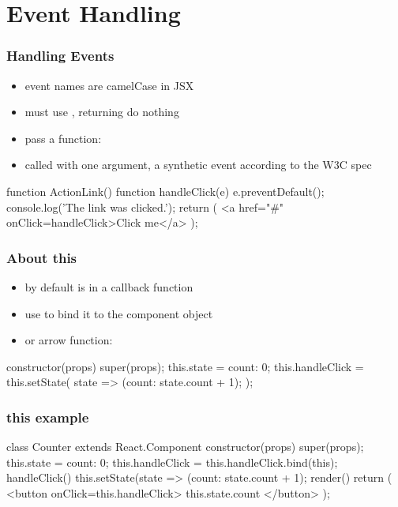 \section{Event Handling}
\begin{frame}[fragile] \frametitle{Handling Events}
\begin{itemize}
  \item event names are camelCase in JSX
  \item must use , returning  do nothing
  \item pass a function: 
  \item called with one argument, a synthetic event according to the W3C spec
\end{itemize}
\begin{CodeBox}{}
function ActionLink() {
  function handleClick(e) {
    e.preventDefault();
    console.log('The link was clicked.');
  }
  return (
    <a href="#" onClick={handleClick}>Click me</a>
  );
}
\end{CodeBox}
\end{frame}

\begin{frame}[fragile] \frametitle{About this}
\begin{itemize}
  \item by default  is  in a callback function
  \item use  to bind it to the component object
  \item or arrow function:
\end{itemize}
\begin{CodeBox}{}
  constructor(props) {
    super(props);
    this.state = {count: 0};
    this.handleClick = this.setState(
      state => ({count: state.count + 1});
  )};
\end{CodeBox}
\end{frame}
\begin{frame}[fragile] \frametitle{this example}
\begin{CodeBox}{}
class Counter extends React.Component {
  constructor(props) {
    super(props);
    this.state = {count: 0};
    this.handleClick = this.handleClick.bind(this);
  }
  handleClick() {
    this.setState(state => ({count: state.count + 1});
  }
  render() {
    return (
      <button onClick={this.handleClick}>
        {this.state.count}
      </button>
    );
  }
}
\end{CodeBox}
\end{frame}

